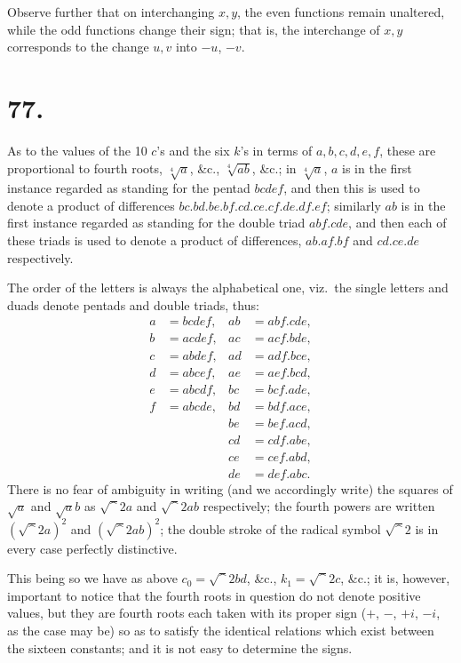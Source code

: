 \documentclass[11pt,a4paper]{article}
\begin{document}
Observe further that on interchanging $x,y$, the even functions remain unaltered, while the odd functions change their sign; that is, the interchange of $x,y$ corresponds to the change $u,v$ into $-u$, $-v$.

\section*{77.}
\label{sec:77}

As to the values of the 10 $c$'s and the six $k$'s in terms of $a,b,c,d,e,f$, these are proportional to fourth roots, $\sqrt[4]{a}$, \&c., $\sqrt[4]{ab}$, \&c.; in $\sqrt[4]{a}$, $a$ is in the first instance regarded as standing for the pentad $bcdef$, and then this is used to denote a product of differences $bc.bd.be.bf.cd.ce.cf.de.df.ef$; similarly $ab$ is in the first instance regarded as standing for the double triad $abf.cde$, and then each of these triads is used to denote a product of differences, $ab.af.bf$ and $cd.ce.de$ respectively.

The order of the letters is always the alphabetical one, viz.\ the single letters and duads denote pentads and double triads, thus:
\begin{align*}
a &= bcdef, & ab &= abf.cde, \\
b &= acdef, & ac &= acf.bde, \\
c &= abdef, & ad &= adf.bce, \\
d &= abcef, & ae &= aef.bcd, \\
e &= abcdf, & bc &= bcf.ade, \\
f &= abcde, & bd &= bdf.ace, \\
& & be &= bef.acd, \\
& & cd &= cdf.abe, \\
& & ce &= cef.abd, \\
& & de &= def.abc.
\end{align*}
There is no fear of ambiguity in writing (and we accordingly write) the squares of $\surd a$ and $\surd ab$ as $\surd^2 a$ and $\surd^2 ab$ respectively; the fourth powers are written $(\surd^2 a)^2$ and $(\surd^2 ab)^2$; the double stroke of the radical symbol $\surd^2$ is in every case perfectly distinctive.

This being so we have as above $c_0 = \surd^2 bd$, \&c., $k_1 = \surd^2 c$, \&c.; it is, however, important to notice that the fourth roots in question do not denote positive values, but they are fourth roots each taken with its proper sign ($+$, $-$, $+i$, $-i$, as the case may be) so as to satisfy the identical relations which exist between the sixteen constants; and it is not easy to determine the signs.
\end{document}
